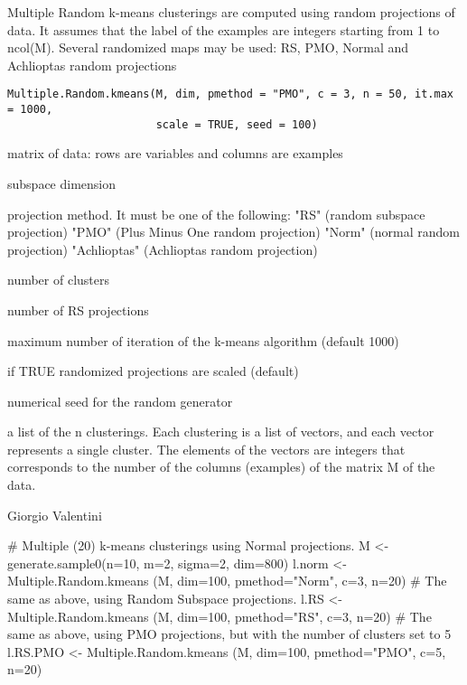 \documentclass{article}
\begin{document}
\begin{Description}\relax
Multiple Random k-means clusterings are computed using random projections of data.
It assumes that the label of the examples are integers starting from 1 to ncol(M).
Several randomized maps may be used: RS, PMO, Normal and Achlioptas random projections
\end{Description}
\begin{Usage}
\begin{verbatim}
Multiple.Random.kmeans(M, dim, pmethod = "PMO", c = 3, n = 50, it.max = 1000, 
                       scale = TRUE, seed = 100)
\end{verbatim}
\end{Usage}
\begin{Arguments}
\begin{ldescription}
\item[\code{M}] matrix of data: rows are variables and columns are examples 
\item[\code{dim}] subspace dimension 
\item[\code{pmethod}] projection method. It must be one of the following: 
"RS" (random subspace projection)
"PMO" (Plus Minus One random projection)
"Norm" (normal random projection)
"Achlioptas" (Achlioptas random projection) 
\item[\code{c}] number of clusters 
\item[\code{n}] number of RS projections 
\item[\code{it.max}] maximum number of iteration of the k-means algorithm (default 1000) 
\item[\code{scale}] if TRUE randomized projections are scaled (default) 
\item[\code{seed}] numerical seed for the random generator 
\end{ldescription}
\end{Arguments}
\begin{Value}
a list  of the n clusterings. Each clustering is a list of vectors,
and each vector represents a single cluster. The elements of the vectors are integers that corresponds to the number
of the columns (examples) of the matrix M of the data.
\end{Value}
\begin{Author}\relax
Giorgio Valentini 
\end{Author}
\begin{Examples}
\begin{ExampleCode}
# Multiple (20) k-means clusterings using Normal projections. 
M <- generate.sample0(n=10, m=2, sigma=2, dim=800)
l.norm <- Multiple.Random.kmeans (M, dim=100, pmethod="Norm", c=3, n=20)
# The same as above, using Random Subspace projections.
l.RS <-  Multiple.Random.kmeans (M, dim=100, pmethod="RS", c=3,  n=20)
# The same as above, using PMO projections, but with the number of clusters set to 5
l.RS.PMO <-  Multiple.Random.kmeans (M, dim=100, pmethod="PMO", c=5, n=20)
\end{ExampleCode}
\end{Examples}
\end{document}
